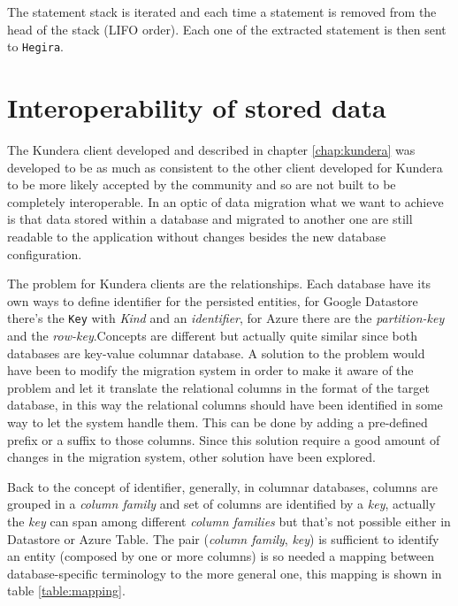 \noindent The statement stack is iterated and each time a statement is removed from the head of the stack (LIFO order). Each one of the extracted statement is then sent to \texttt{Hegira}.


\section{Interoperability of stored data}
The Kundera client developed and described in chapter \ref{chap:kundera} was developed to be as much as consistent to the other client developed for Kundera to be more likely accepted by the community and so are not built to be completely interoperable.
In an optic of data migration what we want to achieve is that data stored within a database and migrated to another one are still readable to the application without changes besides the new database configuration. 

\noindent The problem for Kundera clients are the relationships. Each database have its own ways to define identifier for the persisted entities, for Google Datastore there's the \texttt{Key} with \textit{Kind} and an \textit{identifier}, for Azure there are the \textit{partition-key} and the \textit{row-key}.Concepts are different but actually quite similar since both databases are key-value columnar database. 
A solution to the problem would have been to modify the migration system in order to make it aware of the problem and let it translate the relational columns in the format of the target database, in this way the relational columns should have been identified in some way to let the system handle them. This can be done by adding a pre-defined prefix or a suffix to those columns.
Since this solution require a good amount of changes in the migration system, other solution have been explored.
 
\newparagraph Back to the concept of identifier, generally, in columnar databases, columns are grouped in a \textit{column family} and set of columns are identified by a \textit{key}, actually the \textit{key} can span among different \textit{column families} but that's not possible either in Datastore or Azure Table.
The pair (\textit{column family}, \textit{key}) is sufficient to identify an entity (composed by one or more columns) is so needed a mapping between database-specific terminology to the more general one, this mapping is shown in table \ref{table:mapping}.

